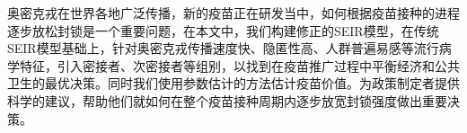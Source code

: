 \begin{abstractzh}
    奥密克戎在世界各地广泛传播，新的疫苗正在研发当中，如何根据疫苗接种的进程逐步放松封锁是一个重要问题，在本文中，我们构建修正的SEIR模型，在传统SEIR模型基础上，针对奥密克戎传播速度快、隐匿性高、人群普遍易感等流行病学特征，引入密接者、次密接者等组别，以找到在疫苗推广过程中平衡经济和公共卫生的最优决策。同时我们使用参数估计的方法估计疫苗价值。为政策制定者提供科学的建议，帮助他们就如何在整个疫苗接种周期内逐步放宽封锁强度做出重要决策。
\end{abstractzh}

\begin{abstracten}
\end{abstracten}
